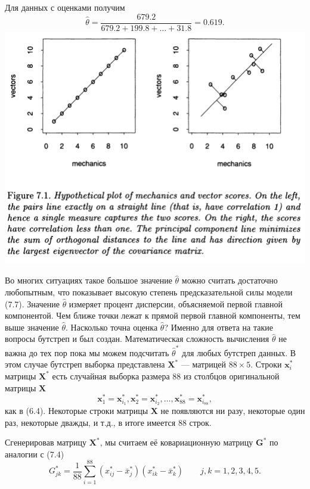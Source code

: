 Для данных с оценками получим
\begin{equation}
  \hat \theta = \frac{679.2}{679.2+199.8+\ldots+31.8} = 0.619.
\end{equation}
\includegraphics[width=0.85\linewidth]{6/f71.png}
\setcounter{figure}{1}

Во многих ситуациях такое большое значение $\hat \theta$ можно считать достаточно любопытным, что показывает высокую степень предсказательной силы модели (7.7).
Значение $\hat \theta$ измеряет процент дисперсии, объясняемой первой главной компонентой. Чем ближе точки лежат к прямой первой главной компоненты, тем выше значение $\hat \theta$.
Насколько точна оценка $\hat \theta$? Именно для ответа на такие вопросы бутстреп и был создан. Математическая сложность вычисления $\hat \theta$ не важна до тех пор пока мы можем подсчитать $\hat \theta^*$ для любых бутстреп данных. В этом случае бутстреп выборка представлена $\mathbf X^*$ --- матрицей $88\times 5$. Строки $\mathbf x_i^*$ матрицы $\mathbf X^*$ есть случайная выборка размера 88 из столбцов оригинальной матрицы $\mathbf X$
\begin{equation}
	\mathbf x_1^* = \mathbf x_{i_1}^*,\mathbf x_2^* = \mathbf x_{i_2}^*, \ldots, \mathbf x_{88}^* = \mathbf x_{i_{88}}^*, 
\end{equation}
как в (6.4). Некоторые строки матрицы $\mathbf X$ не появляются ни разу, некоторые один раз, некоторые дважды, и т.д., в итоге имеется 88 строк.

Сгенерировав матрицу $\mathbf X^*$, мы считаем её ковариационную матрицу $\mathbf G^*$ по аналогии с (7.4)
\begin{equation}
G_{jk}^* = \frac{1}{88}\sum_{i = 1}^{88} (x_{ij}^* - \bar x_j^*) (x_{ik}^* - \bar x_k^*) \qquad j,k = 1,2,3,4,5.
\end{equation}


